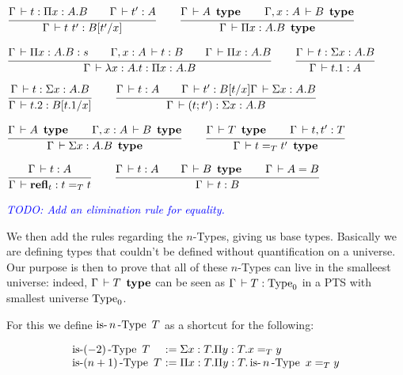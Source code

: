 \documentclass[a4paper,english]{lipics-utf8x}
\newcommand\meta[1]{\noindent\textcolor{blue}{\emph{#1}}}
\begin{document}
  \begin{center}
  \(
    \ru{\Gamma \der t : \Pi x:A.B \qquad
        \Gamma \der t' : A
      }{\Gamma \der t\ t' : B[t'/x]}
    \qquad
    \ru{\Gamma \der A \type \qquad
        \Gamma, x:A \der B \type
      }{\Gamma \der \Pi x:A.B \type}
  \)
  \end{center}

  \begin{center}
  \(
    \ru{\Gamma \der \Pi x:A.B : s \qquad
        \Gamma, x:A \der t : B \qquad
        \Gamma \der \Pi x:A.B
      }{\Gamma \der \lambda x:A.t : \Pi x:A.B}
    \qquad
    \ru{\Gamma \der t : \Sigma x:A.B
      }{\Gamma \der t.1 : A}
  \)
  \end{center}

  \begin{center}
  \(
    \ru{\Gamma \der t : \Sigma x:A.B
      }{\Gamma \der t.2 : B[t.1/x]}
    \qquad
    \ru{\Gamma \der t : A \qquad
        \Gamma \der t' : B[t/x]
        \Gamma \der \Sigma x:A.B
      }{\Gamma \der (t ; t') : \Sigma x:A.B}
  \)
  \end{center}

  \begin{center}
  \(
    \ru{\Gamma \der A \type \qquad
        \Gamma, x:A \der B \type
      }{\Gamma \der \Sigma x:A.B \type}
    \qquad
    \ru{\Gamma \der T \type \qquad
        \Gamma \der t,t' : T
      }{\Gamma \der t =_T t' \type}
  \)
  \end{center}

  \begin{center}
  \(
    \ru{\Gamma \der t : A
      }{\Gamma \der \refl_t : t =_T t}
    \qquad
    \ru{\Gamma \der t : A \qquad
        \Gamma \der B \type \qquad
        \Gamma \der A = B
      }{\Gamma \der t : B}
  \)
  \end{center}

  \meta{TODO: Add an elimination rule for equality.}

  \noindent %
  We then add the rules regarding the $n$-Types, giving us base
  types.
  Basically we are defining types that couldn't be defined without
  quantification on a universe. Our purpose is then to prove
  that all of these $n$-Types can live in the smalleest universe:
  indeed, $\Gamma \,\vdash T \operatorname{\ \mathbf{type}}$ can be seen as
  $\Gamma \,\vdash T : \operatorname{Type}_0$ in a PTS with smallest universe
  $\operatorname{Type}_0$.

  For this we define $\operatorname{is-}n\operatorname{-Type}\ T$ as a shortcut for the following:

  \[
  \begin{array}{l@{~}l}
    \isnType{(-2)}{T}  & := \Sigma x:T. \Pi y:T. x =_T y \\
    \isnType{(n+1)}{T} & := \Pi x:T. \Pi y:T. \isnType{n}{x =_T y}
  \end{array}
  \]
\end{document}
